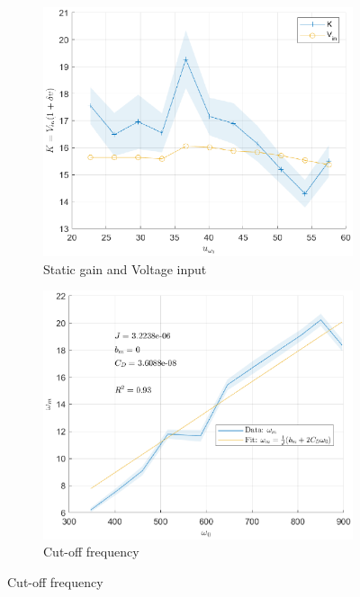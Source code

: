 \begin{figure}[H]
    \centering
    \begin{minipage}{0.49\textwidth}
        \begin{figure}[H]
            \includegraphics[width = \textwidth]{./figs/small_perturbation/K-Vin.eps}
            \caption{Static gain and Voltage input}
        \end{figure}
    \end{minipage}
    \begin{minipage}{0.49\textwidth}
        \begin{figure}[H]
            \includegraphics[width = \textwidth]{./figs/small_perturbation/omega_fit.eps}
            \caption{Cut-off frequency}
        \end{figure}
    \end{minipage}
\end{figure}



